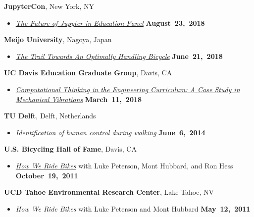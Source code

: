 \documentclass[10pt]{article}
\newenvironment{outerlist}[1][\enskip\textbullet]%
        {\begin{itemize}[#1]}{\end{itemize}%
         \vspace{-.6\baselineskip}}
\newcommand{\blankline}{\quad\pagebreak[2]}
\begin{document}
\blankline

\textbf{JupyterCon}, New York, NY
\begin{outerlist}
\item[]
  \href{}{\textit{The Future of Jupyter in Education Panel}}
    \hfill \textbf{August~23,~2018}
\end{outerlist}

\blankline

\textbf{Meijo University}, Nagoya, Japan
\begin{outerlist}
\item[]
  \href{}{\textit{The Trail Towards An Optimally Handling Bicycle}}
    \hfill \textbf{June~21,~2018}
\end{outerlist}

\blankline

\textbf{UC Davis Education Graduate Group}, Davis, CA
\begin{outerlist}
\item[]
  \href{}{\textit{Computational Thinking in the Engineering Curriculum: A Case
  Study in Mechanical Vibrations}}
    \hfill \textbf{March~11,~2018}
\end{outerlist}

\blankline

\textbf{TU Delft}, Delft, Netherlands
\begin{outerlist}
\item[]
  \href{http://www.moorepants.info/presentations/2014/tu-delft-robotics-talk-2014}{\textit{Identification
  of human control during walking}}
    \hfill \textbf{June~6,~2014}
\end{outerlist}

\blankline

\textbf{U.S. Bicycling Hall of Fame}, Davis, CA
\begin{outerlist}
\item[] \textit{\href{http://mae.ucdavis.edu/~biosport/bhoftalk/}{How We Ride
  Bikes}} with Luke Peterson, Mont Hubbard, and Ron Hess
    \hfill \textbf{October~19,~2011}
\end{outerlist}

\blankline

\textbf{UCD Tahoe Environmental Research Center}, Lake Tahoe, NV
\begin{outerlist}
  \item[] \textit{How We Ride Bikes} with Luke Peterson and Mont Hubbard \hfill
    \textbf{May~12,~2011}
\end{outerlist}

\blankline
\end{document}
